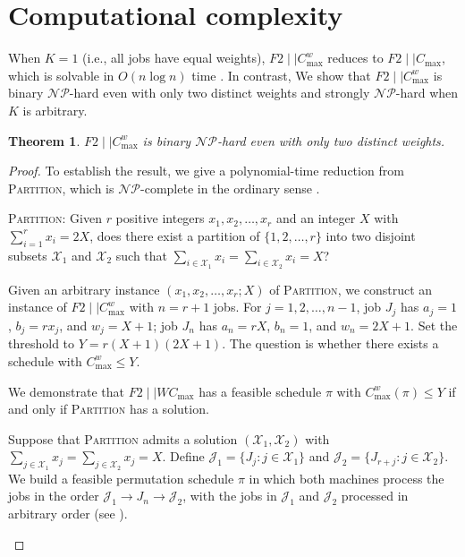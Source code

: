 ﻿\documentclass[12pt]{article} \textheight=24.5cm \textwidth=16.5cm \parskip = 0.165cm
\newtheorem{theorem}{Theorem}[section]
\let\origsection\section
\renewcommand{\section}{\FloatBarrier\origsection}
\begin{document}
\begin{sloppypar}
        \section{Computational complexity} \label{sec:complexity}

        When $K=1$ (i.e., all jobs have equal weights), $F2 \mid \mid C_{\max}^w$ reduces to $F2 \mid \mid C_{\max}$, which is solvable in $O(n \log n)$ time \citep{Johnson1954NRL}.
        In contrast, We show that $F2 \mid \mid C_{\max}^w$ is binary $\mathcal{NP}$-hard even with only two distinct weights and strongly $\mathcal{NP}$-hard when $K$ is arbitrary.

        \begin{theorem}\label{thm:nphard}
        $F2 \mid \mid C_{\max}^w$ is binary $\mathcal{NP}$-hard even with only two distinct weights.
        \end{theorem}
        \begin{proof}
        To establish the result, we give a polynomial-time reduction from \textsc{Partition}, which is $\mathcal{NP}$-complete in the ordinary sense \citep{GareyJohnson1979computer}.

        \textsc{Partition}: Given $r$ positive integers $x_1, x_2, \ldots, x_r$ and an integer $X$ with $\sum_{i=1}^{r}x_i=2X$, does there exist a partition of $\{1, 2, \ldots, r\}$ into two disjoint subsets $\mathcal{X}_1$ and $\mathcal{X}_2$ such that $\sum_{i \in \mathcal{X}_1} x_i=\sum_{i\in \mathcal{X}_2} x_i=X$?

        Given an arbitrary instance $(x_1, x_2, \ldots, x_r; X)$ of \textsc{Partition}, we construct an instance of $F2 \mid \mid C_{\max}^w$ with $n=r+1$ jobs.
        For $j=1, 2, \ldots, n-1$, job $J_j$ has $a_j=1$, $b_j=r x_j$, and $w_j=X+1$; job $J_n$ has $a_n=rX$, $b_n=1$, and $w_n=2X+1$.
        Set the threshold to $Y=r(X+1)(2X+1)$.
        The question is whether there exists a schedule with $C_{\max}^w \leq Y$.

        We demonstrate that $F2 \mid \mid W C_{\max}$ has a feasible schedule $\pi$ with $C_{\max}^w(\pi) \leq Y$ if and only if \textsc{Partition} has a solution.

        Suppose that \textsc{Partition} admits a solution $(\mathcal{X}_1, \mathcal{X}_2)$ with $\sum_{j \in \mathcal{X}_1} x_j = \sum_{j \in \mathcal{X}_2} x_j=X$.
        Define $\mathcal{J}_1=\{J_j: j \in \mathcal{X}_1\}$ and $\mathcal{J}_2=\{J_{r+j}: j \in \mathcal{X}_2\}$.
        We build a feasible permutation schedule $\pi$ in which both machines process the jobs in the order $\mathcal{J}_1 \to J_n \to \mathcal{J}_2$, with the jobs in $\mathcal{J}_1$ and $\mathcal{J}_2$ processed in arbitrary order (see ).
            \begin{figure}[H]
                \centering
                \begin{tikzpicture}[x=0.15in, y=0.3in]


\end{tikzpicture}
\end{figure}
\end{proof}
\end{sloppypar}
\end{document}
